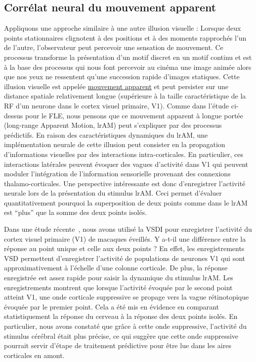 \documentclass[11pt,french,a4paper,oneside]{article}%
\begin{document}
\subsection{Corrélat neural du mouvement apparent}
Appliquons une approche similaire à une autre illusion visuelle :
Lorsque deux points stationnaires clignotent à des positions et à des
moments rapprochés l'un de l'autre, l'observateur peut percevoir une
sensation de mouvement. Ce processus transforme la présentation d'un motif
discret en un motif continu et est à la base des processus qui nous font percevoir au cinéma une image animée alors que nos yeux ne ressentent qu'une succession rapide d'images statiques.
Cette illusion visuelle est appelée
\href{https://en.wikipedia.org/wiki/Beta_movement}{mouvement apparent}
et peut persister sur une distance spatiale relativement longue (supérieure à la
taille caractéristique de la RF d'un neurone dans le cortex visuel
primaire, V1). Comme dans l'étude ci-dessus pour le FLE, nous pensons que ce
mouvement apparent à longue portée (long-range Apparent Motion, lrAM) peut s'expliquer par des
processus prédictifs. En raison des caractéristiques dynamiques du lrAM,
une implémentation neurale de cette illusion peut consister en la
propagation d'informations visuelles par des interactions
intra-corticales. En particulier, ces interactions latérales peuvent
évoquer des vagues d'activité dans V1 qui peuvent moduler l'intégration de
l'information sensorielle provenant des connexions thalamo-corticales.
Une perspective intéressante est donc d'enregistrer l'activité neurale
lors de la présentation du stimulus lrAM. Ceci permet d'évaluer
quantitativement pourquoi la superposition de deux points comme dans le
lrAM est ``plus'' que la somme des deux points isolés.

Dans une étude récente~\citep{Chemla19}, nous avons utilisé la VSDI
pour enregistrer l'activité du cortex visuel primaire (V1) de macaques
éveillés. Y a-t-il une différence entre la réponse au point unique et
celle aux deux points ? En effet, les enregistrements VSD permettent
d'enregistrer l'activité de populations de neurones V1 qui sont
approximativement à l'échelle d'une colonne corticale. De plus, la
réponse enregistrée est assez rapide pour saisir la dynamique du
stimulus lrAM. Les enregistrements montrent que lorsque l'activité
évoquée par le second point atteint V1, une onde corticale suppressive se
propage vers la vague rétinotopique évoquée par le premier point. Cela a
été mis en évidence en comparant statistiquement la réponse du cerveau à
la réponse des deux points isolés. En particulier, nous avons constaté
que grâce à cette onde suppressive, l'activité du stimulus cérébral
était plus précise, ce qui suggère que cette onde suppressive pourrait
servir d'étape de traitement prédictive pour être lue dans les aires
corticales en amont.
\end{document}
